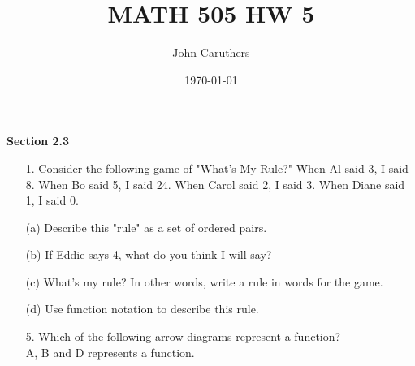 \documentclass{article}
\title{MATH 505 HW 5}
\author{John Caruthers}
\date\today
\begin{document}
\maketitle

\textbf{Section 2.3}

\begin{itemize}
    \item[1.] Consider the following game of "What's My Rule?"  When Al said 3, I said 8.  When Bo said 5, I said 24.  When Carol said 2, I said 3.  When Diane said 1, I said 0.
    
    (a) Describe this "rule" as a set of ordered pairs.\\
    
    (b) If Eddie says 4, what do you think I will say?\\
    
    (c) What's my rule? In other words, write a rule in words for the game.\\
    
    (d) Use function notation to describe this rule.\\
    
    \item[5.] Which of the following arrow diagrams represent a function?\\
    {\color{blue} A, B and D represents a function.}
    
    
    

\end{itemize}
\end{document}
